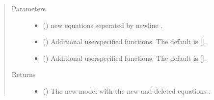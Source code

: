 \documentclass[letterpaper,10pt,english]{sphinxmanual}
\begin{document}
\begin{fulllineitems}
\begin{fulllineitems}
\begin{quote}
\begin{description}
\begin{itemize}
\end{itemize}


\end{description}\end{quote}

\end{fulllineitems}


\begin{fulllineitems}
\label{\detokenize{index:modelclass.Modify_Mixin.equpdate}}
\pysigstartsignatures
{}
\pysigstopsignatures\begin{quote}\begin{description}
\item[{Parameters}] \leavevmode\begin{itemize}
\item {} 
\sphinxAtStartPar
{} () \textendash{} new equations seperated by newline .

\item {} 
\sphinxAtStartPar
{} (\sphinxstyleliteralemphasis{\sphinxupquote{, }}) \textendash{} Additional userspecified functions. The default is {[}{]}.

\item {} 
\sphinxAtStartPar
{} (\sphinxstyleliteralemphasis{\sphinxupquote{, }}) \textendash{} Additional userspecified functions. The default is {[}{]}.

\end{itemize}

\item[{Returns}] \leavevmode
\sphinxAtStartPar
\begin{itemize}
\item {} 
\sphinxAtStartPar
{} () \textendash{} The new  model with the new and deleted equations .


\end{itemize}
\end{description}
\end{quote}
\end{fulllineitems}
\end{fulllineitems}
\end{document}
